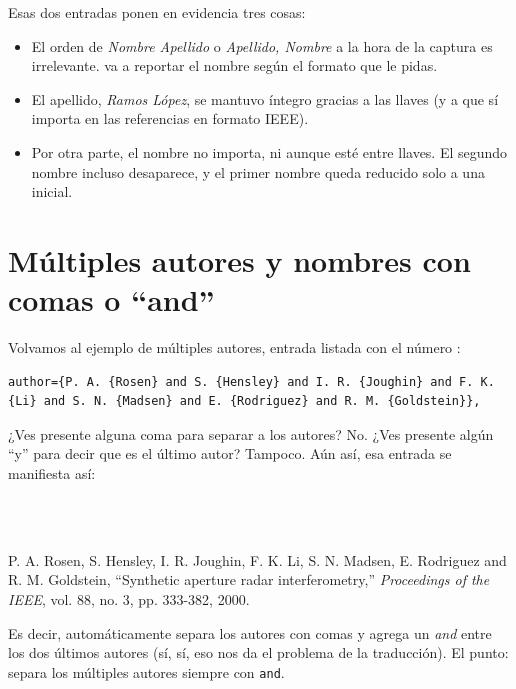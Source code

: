 Esas dos entradas ponen en evidencia tres cosas:
\begin{itemize}
	\item El orden de \emph{Nombre Apellido} o \emph{Apellido, Nombre} a la hora de la captura es irrelevante. \BibTeX{} va a reportar el nombre según el formato que le pidas.
	\item El apellido, \emph{Ramos López}, se mantuvo íntegro gracias a las llaves (y a que sí importa en las referencias en formato IEEE).
	\item Por otra parte, el nombre no importa, ni aunque esté entre llaves. El segundo nombre incluso desaparece, y el primer nombre queda reducido solo a una inicial.
\end{itemize}



\section{Múltiples autores y nombres con comas o ``and''}



Volvamos al ejemplo de múltiples autores, entrada listada con el número \cite{bib:radar}:

\begin{lstlisting}[style=bibtex]
author={P. A. {Rosen} and S. {Hensley} and I. R. {Joughin} and F. K. {Li} and S. N. {Madsen} and E. {Rodriguez} and R. M. {Goldstein}},
\end{lstlisting}

¿Ves presente alguna coma para separar a los autores? No. ¿Ves presente algún ``y'' para decir que es el último autor? Tampoco. Aún así, esa entrada se manifiesta así:

\vspace{10pt}
\noindent\begin{minipage}{0.05\linewidth}
\cite{bib:radar}\\
~\\
\end{minipage}
\begin{minipage}{0.9415\linewidth}
 P. A. Rosen, S. {Hensley}, I. R. Joughin, F. K. Li, S. N. {Madsen}, E. Rodriguez and R. M. Goldstein, ``Synthetic aperture radar interferometry,''	\emph{Proceedings of the IEEE}, vol. 88, no. 3, pp. 333-382, 2000.
\end{minipage}
\vspace{1pt}

Es decir, automáticamente \BibTeX{} separa los autores con comas y agrega un \emph{and} entre los dos últimos autores (sí, sí, eso nos da el problema de la traducción). El punto: separa los múltiples autores siempre con \texttt{and}.

